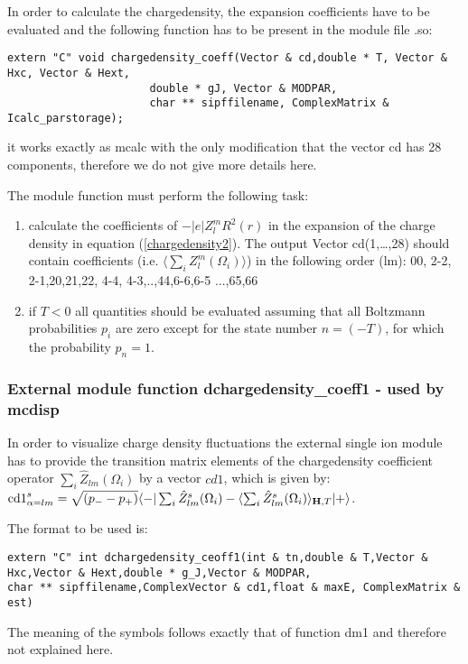In order to calculate the chargedensity, the expansion coefficients
have to be evaluated and
 the following function has to be present in the module file {\prg *.so}:

\begin{verbatim}
extern "C" void chargedensity_coeff(Vector & cd,double * T, Vector & Hxc, Vector & Hext,
                      double * gJ, Vector & MODPAR,
                      char ** sipffilename, ComplexMatrix & Icalc_parstorage);
\end{verbatim}

it works exactly as {\prg mcalc} with the only modification
that the vector cd has 28 components, therefore we do not give more details here.

The module function must perform the following task:
\begin{enumerate}
\item calculate the coefficients of $-|e|Z_l^m R^2(r)$ in the expansion of
      the charge density in equation (\ref{chargedensity2}).
      The output Vector cd(1,\dots,28) should contain  coefficients 
     (i.e. $\langle\sum_i Z_l^m (\Omega_i)\rangle$)
      in the following order (lm):  00, 2-2, 2-1,20,21,22, 4-4, 4-3,..,44,6-6,6-5 ...,65,66
\item if $T<0$ all quantities should be evaluated assuming that all Boltzmann probabilities $p_i$
 are zero except for the state number $n=(-T)$, for which the probability $p_n=1$.
\end{enumerate}


\subsubsection{External module function {\prg dchargedensity\_coeff1} - used by {\prg mcdisp}}

In order to visualize charge density  fluctuations 
 the external single ion module has to provide the transition
matrix elements of the chargedensity coefficient operator $\sum_i \hat Z_{lm}(\Omega_i)$ by a
vector $cd1$, which is given by:
 ${\rm cd1}^s_{\alpha=lm}=\sqrt{(p_--p_+)}\langle -|\sum_i \hat  Z^s_{lm}(\Omega_i)-\langle \sum_i\hat  Z^s_{lm}(\Omega_i)\rangle_{\mathbf H,T}|+\rangle$. 

The format to be used is:
{\footnotesize
\begin{verbatim}
extern "C" int dchargedensity_ceoff1(int & tn,double & T,Vector & Hxc,Vector & Hext,double * g_J,Vector & MODPAR,
char ** sipffilename,ComplexVector & cd1,float & maxE, ComplexMatrix & est)
\end{verbatim}
}
The meaning of the symbols follows exactly that of function 
{\prg dm1} and therefore not explained here.


